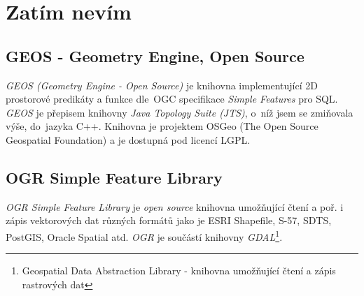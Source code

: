 \chapter{Zatím nevím}
\label{4-nevim}

\section{GEOS - Geometry Engine, Open Source}

\textit{GEOS (Geometry Engine - Open Source)} je knihovna implementující 2D prostorové predikáty a funkce dle~OGC specifikace \textit{Simple Features} pro SQL. \textit{GEOS}
je přepisem knihovny \textit{Java Topology Suite (JTS)}, o~níž jsem se zmiňovala výše, do~jazyka C++. Knihovna je projektem OSGeo (The Open Source Geospatial Foundation) a je
dostupná pod licencí LGPL.

\section{OGR Simple Feature Library}

\textit{OGR Simple Feature Library} je \textit{open source} knihovna umožňující čtení a poř. i zápis vektorových dat různých formátů jako je ESRI Shapefile, S-57, SDTS, 
PostGIS, Oracle Spatial atd. \textit{OGR} je součástí knihovny \textit{GDAL}\footnote{Geospatial Data Abstraction Library - knihovna umožňující čtení a zápis rastrových dat}.